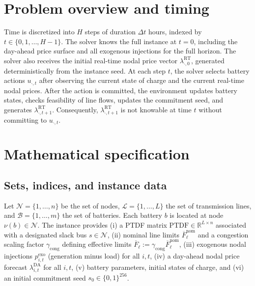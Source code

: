 \documentclass[11pt]{article}
\begin{document}
\section{Problem overview and timing}
Time is discretized into $H$ steps of duration $\Delta t$ hours, indexed by $t\in\{0,1,\dots,H-1\}$. The solver knows the full instance at $t=0$, including the day-ahead price surface and all exogenous injections for the full horizon. The solver also receives the initial real-time nodal price vector $\lambda^{\mathrm{RT}}_{\cdot,0}$, generated deterministically from the instance seed. At each step $t$, the solver selects battery actions $u_{\cdot,t}$ after observing the current state of charge and the current real-time nodal prices. After the action is committed, the environment updates battery states, checks feasibility of line flows, updates the commitment seed, and generates $\lambda^{\mathrm{RT}}_{\cdot,t+1}$. Consequently, $\lambda^{\mathrm{RT}}_{\cdot,t+1}$ is not knowable at time $t$ without committing to $u_{\cdot,t}$.

\section{Mathematical specification}

\subsection{Sets, indices, and instance data}
Let $\mathcal{N}=\{1,\dots,n\}$ be the set of nodes, $\mathcal{L}=\{1,\dots,L\}$ the set of transmission lines, and $\mathcal{B}=\{1,\dots,m\}$ the set of batteries. Each battery $b$ is located at node $\nu(b)\in\mathcal{N}$. The instance provides (i) a PTDF matrix $\mathrm{PTDF}\in\mathbb{R}^{L\times n}$ associated with a designated slack bus $s\in\mathcal{N}$, (ii) nominal line limits $\overline{F}^{\mathrm{nom}}_\ell$ and a congestion scaling factor $\gamma_{\mathrm{cong}}$ defining effective limits $\overline{F}_\ell:=\gamma_{\mathrm{cong}}\overline{F}^{\mathrm{nom}}_\ell$, (iii) exogenous nodal injections $p^{\mathrm{exo}}_{i,t}$ (generation minus load) for all $i,t$, (iv) a day-ahead nodal price forecast $\lambda^{\mathrm{DA}}_{i,t}$ for all $i,t$, (v) battery parameters, initial states of charge, and (vi) an initial commitment seed $s_0\in\{0,1\}^{256}$.
\end{document}
